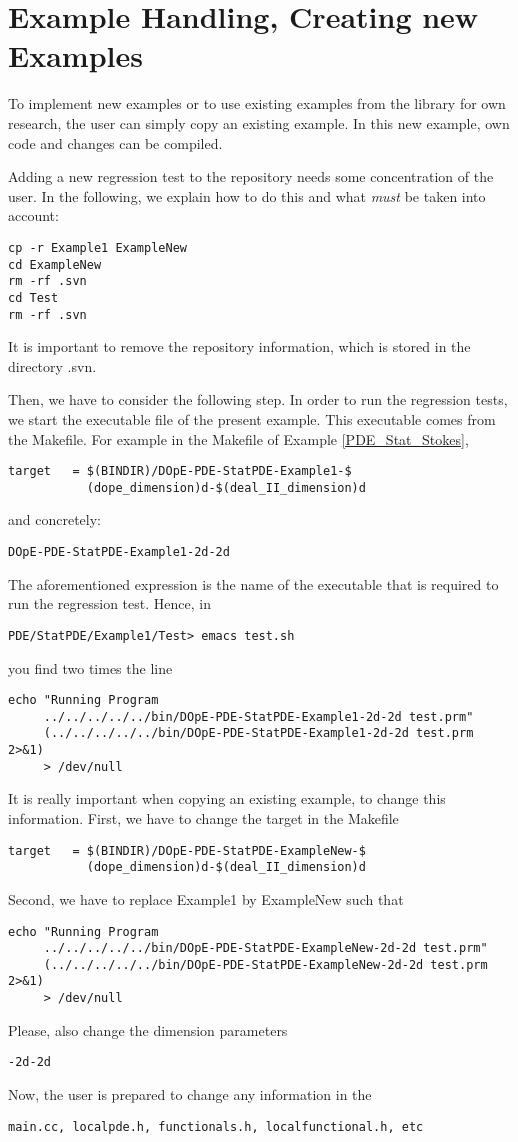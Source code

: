 \chapter{Example Handling, Creating new Examples}
\label{chap:howtoex}
To implement new examples or to use existing examples 
from the library for own research, the user 
can simply copy an existing example. In this 
new example, own code and changes can be compiled.

Adding a new regression test to the repository 
needs some concentration of the user. In the 
following, we explain how to do this and what 
\textit{must} be taken into account:
\begin{verbatim}
cp -r Example1 ExampleNew
cd ExampleNew
rm -rf .svn
cd Test
rm -rf .svn
\end{verbatim}
It is important to remove the repository information,
which is stored in the directory .svn.

Then, we have to consider the following step. In order to 
run the regression tests, we start the executable file
of the present example. This executable comes from the 
Makefile. For example in the Makefile of 
Example \ref{PDE_Stat_Stokes}, 
\begin{verbatim}
target   = $(BINDIR)/DOpE-PDE-StatPDE-Example1-$
           (dope_dimension)d-$(deal_II_dimension)d
\end{verbatim}
and concretely:
\begin{verbatim}
DOpE-PDE-StatPDE-Example1-2d-2d
\end{verbatim}
The aforementioned expression is the name of 
the executable that is required to run the 
regression test. Hence, in 
\begin{verbatim}
PDE/StatPDE/Example1/Test> emacs test.sh
\end{verbatim}
you find two times the line
\begin{verbatim}
echo "Running Program 
     ../../../../../bin/DOpE-PDE-StatPDE-Example1-2d-2d test.prm"
     (../../../../../bin/DOpE-PDE-StatPDE-Example1-2d-2d test.prm 2>&1) 
     > /dev/null
\end{verbatim} 
It is really important when copying an existing example,
to change this information. 
First, we have to change the target in the Makefile
\begin{verbatim}
target   = $(BINDIR)/DOpE-PDE-StatPDE-ExampleNew-$
           (dope_dimension)d-$(deal_II_dimension)d
\end{verbatim}
Second, we have to replace 
Example1 by ExampleNew such that 
\begin{verbatim}
echo "Running Program 
     ../../../../../bin/DOpE-PDE-StatPDE-ExampleNew-2d-2d test.prm"
     (../../../../../bin/DOpE-PDE-StatPDE-ExampleNew-2d-2d test.prm 2>&1) 
     > /dev/null
\end{verbatim} 
Please, also change the dimension parameters 
\begin{verbatim}
-2d-2d
\end{verbatim} 
Now, the user is prepared to change any information in the 
\begin{verbatim}
main.cc, localpde.h, functionals.h, localfunctional.h, etc
\end{verbatim} 

